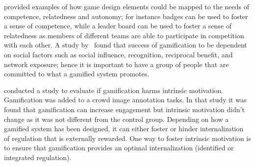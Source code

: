 \cite{sailer2013:psychological} provided examples of how game design elements could be mapped to the needs of competence, relatedness and autonomy; for instance badges can be used to foster a sense of competence, while a leader board can be used to foster a sense of relatedness as members of different teams are able to participate in competition with each other. A study by~\cite{hamari2013social} found that success of gamification to be dependent on social factors such as social influence, recognition, reciprocal benefit, and network exposure; hence it is important to have a group of people that are committed to what a gamified system promotes.

\cite{mekler2013points} conducted a study to evaluate if gamification harms intrinsic motivation. Gamification was added to a crowd image annotation tasks. In that study it was found that gamification can increase engagement but intrinsic motivation didn't change as it was not different from the control group. Depending on how a gamified system has been designed, it can either foster or hinder internalization of regulation that is externally rewarded. One way to foster intrinsic motivation is to ensure that gamification provides an optimal internalization (identified or integrated regulation).


